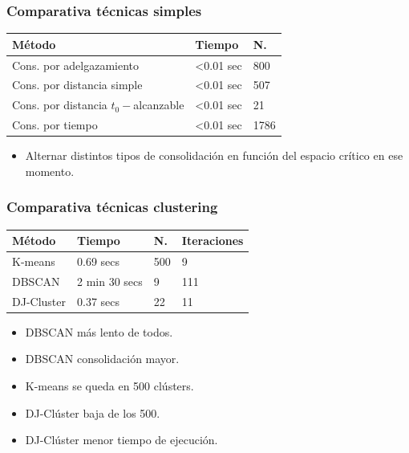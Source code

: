 \documentclass[10pt, spanish]{beamer}
\begin{document}
\begin{frame}[fragile]
\frametitle{Comparativa t\'ecnicas simples}

\begin{center}
\begin{tabular}{|l|l|l|}
	\hline
	\rowcolor{Gray}
	M\'etodo & Tiempo & N. \\
	\hline	
	Cons. por adelgazamiento &  <0.01 sec & 800 \\
	\hline 
	Cons. por distancia simple &  <0.01 sec & 507 \\
	\hline
	Cons. por distancia $t_0-$alcanzable  &  <0.01 sec  & 21\\
	\hline
	Cons. por tiempo &  <0.01 sec  & 1786\\
	\hline
\end{tabular}
\end{center}

\begin{itemize}
	\item Alternar distintos tipos de consolidaci\'on en funci\'on del espacio cr\'itico en ese momento.
\end{itemize}
\end{frame}

\begin{frame}[fragile]
\frametitle{Comparativa t\'ecnicas clustering}
\begin{center}
\begin{tabular}{|l|l|l|l|}
	\hline
	\rowcolor{Gray}
	M\'etodo & Tiempo & N. & Iteraciones\\
	\hline	
	K-means & 0.69 secs & 500 & 9\\
	\hline
	DBSCAN &  2 min 30 secs & 9 & 111 \\
	\hline
	DJ-Cluster &  0.37 secs & 22  & 11\\
	\hline
\end{tabular}
\end{center}

\begin{itemize}
	\item DBSCAN m\'as lento de todos.
	\item DBSCAN consolidaci\'on mayor.
	\item K-means se queda en 500 cl\'usters.
	\item DJ-Cl\'uster baja de los 500.
	\item DJ-Cl\'uster menor tiempo de ejecuci\'on.
\end{itemize}

\end{frame}
\end{document}
